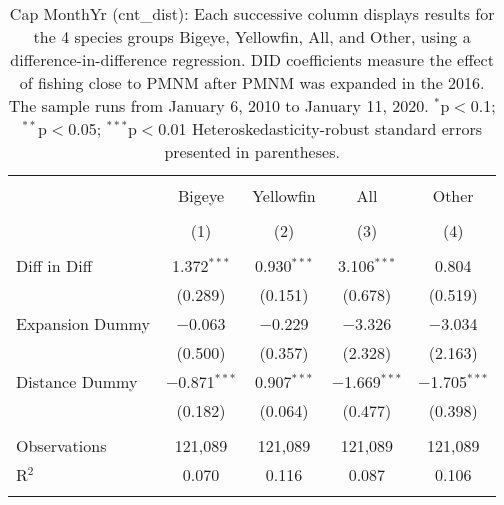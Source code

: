 
\begin{table}[!htbp] \centering 
  \caption{Cap MonthYr (cnt_dist): Each successive column displays results for the 4 species groups Bigeye, Yellowfin, All, and Other, using a difference-in-difference regression. DID coefficients measure the effect of fishing close to PMNM after PMNM was expanded in the 2016. The sample runs from January 6, 2010 to January 11, 2020. $^{*}$p$<$0.1; $^{**}$p$<$0.05; $^{***}$p$<$0.01 Heteroskedasticity-robust standard errors presented in parentheses.} 
  \label{tbl:timeFEcnt_dist} 
\begin{tabular}{@{\extracolsep{5pt}}lcccc} 
\\[-1.8ex]\hline 
\hline \\[-1.8ex] 
 & Bigeye & Yellowfin & All & Other \\ 
\\[-1.8ex] & (1) & (2) & (3) & (4)\\ 
\hline \\[-1.8ex] 
 Diff in Diff & 1.372$^{***}$ & 0.930$^{***}$ & 3.106$^{***}$ & 0.804 \\ 
  & (0.289) & (0.151) & (0.678) & (0.519) \\ 
  Expansion Dummy & $-$0.063 & $-$0.229 & $-$3.326 & $-$3.034 \\ 
  & (0.500) & (0.357) & (2.328) & (2.163) \\ 
  Distance Dummy & $-$0.871$^{***}$ & 0.907$^{***}$ & $-$1.669$^{***}$ & $-$1.705$^{***}$ \\ 
  & (0.182) & (0.064) & (0.477) & (0.398) \\ 
 \hline \\[-1.8ex] 
Observations & 121,089 & 121,089 & 121,089 & 121,089 \\ 
R$^{2}$ & 0.070 & 0.116 & 0.087 & 0.106 \\ 
\hline 
\hline \\[-1.8ex] 
\end{tabular} 
\end{table} 
